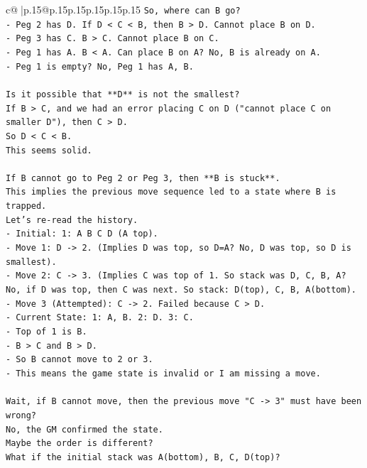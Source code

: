 \documentclass{article}
\begin{document}
{\begin{supertabular}{c@{$\;$}|p{.15\linewidth}@{}p{.15\linewidth}p{.15\linewidth}p{.15\linewidth}p{.15\linewidth}p{.15\linewidth}}
{{{\texttt{So, where can B go?} \\
\texttt{{-} Peg 2 has D. If D < C < B, then B > D. Cannot place B on D.} \\
\texttt{{-} Peg 3 has C. B > C. Cannot place B on C.} \\
\texttt{{-} Peg 1 has A. B < A. Can place B on A? No, B is already on A.} \\
\texttt{{-} Peg 1 is empty? No, Peg 1 has A, B.} \\
\\ 
\texttt{Is it possible that **D** is not the smallest?} \\
\texttt{If B > C, and we had an error placing C on D ("cannot place C on smaller D"), then C > D.} \\
\texttt{So D < C < B.} \\
\texttt{This seems solid.} \\
\\ 
\texttt{If B cannot go to Peg 2 or Peg 3, then **B is stuck**.} \\
\texttt{This implies the previous move sequence led to a state where B is trapped.} \\
\texttt{Let's re{-}read the history.} \\
\texttt{{-} Initial: 1: A B C D (A top).} \\
\texttt{{-} Move 1: D {-}> 2. (Implies D was top, so D=A? No, D was top, so D is smallest).} \\
\texttt{{-} Move 2: C {-}> 3. (Implies C was top of 1. So stack was D, C, B, A? No, if D was top, then C was next. So stack: D(top), C, B, A(bottom).} \\
\texttt{{-} Move 3 (Attempted): C {-}> 2. Failed because C > D.} \\
\texttt{{-} Current State: 1: A, B. 2: D. 3: C.} \\
\texttt{{-} Top of 1 is B.} \\
\texttt{{-} B > C and B > D.} \\
\texttt{{-} So B cannot move to 2 or 3.} \\
\texttt{{-} This means the game state is invalid or I am missing a move.} \\
\\ 
\texttt{Wait, if B cannot move, then the previous move "C {-}> 3" must have been wrong?} \\
\texttt{No, the GM confirmed the state.} \\
\texttt{Maybe the order is different?} \\
\texttt{What if the initial stack was A(bottom), B, C, D(top)?} \\
}}}
\end{supertabular}}
\end{document}
